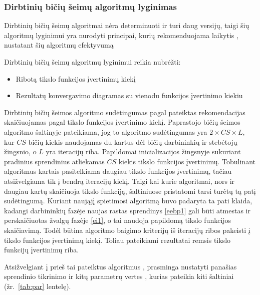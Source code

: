 \documentclass{VUMIFPSmagistrinis}
\begin{document}
\subsubsection{Dirbtinių bičių šeimų algoritmų lyginimas}


Dirbtinių bičių šeimų algoritmai nėra determinuoti ir turi daug versijų, taigi šių algoritmų lyginimui yra nurodyti principai, kurių rekomenduojama laikytis \cite{MLK15}, nustatant šių algoritmų efektyvumą

Dirbtinių bičių šeimų algoritmų lyginimui reikia nubrėžti:
\begin{itemize}
    \item Ribotą tikslo funkcijos įvertinimų kiekį
    \item Rezultatų konvergavimo diagramas su vienodu funkcijos įvertinimo kiekiu
\end{itemize}

Dirbtinių bičių šeimos algoritmo sudėtingumas pagal pateiktas rekomendacijas skaičiuojamas pagal tikslo funkcijos įvertinimo kiekį. Paprastojo bičių šeimos algoritmo šaltinyje pateikiama, jog to algoritmo sudėtingumas yra $2\times CS\times L$, kur $CS$ bičių kiekis naudojamas du kartus dėl bičių darbininkių ir stebėtojų žingsnio, o $L$ yra iteracijų riba. Papildomai inicializacijos žingsnyje sukuriant pradinius sprendinius atliekamas $CS$ kiekis tikslo funkcijos įvertinimų. Tobulinant algoritmus kartais pasitelkiama daugiau tikslo funkcijos įvertinimų, tačiau atsižvelgiama tik į bendrą iteracijų kiekį. Taigi kai kurie algoritmai, nors ir daugiau kartų skaičiuoja tikslo funkciją, šaltiniuose pristatomi tarsi turėtų tą patį sudėtingumą. Kuriant naująjį spietimosi algoritmą buvo padaryta ta pati klaida, kadangi darbininkių fazėje naujas rastas sprendinys \eqref{eebp1} gali būti atmestas ir perskaičiuotas žvalgų fazėje \eqref{ei1}, o tai naudoja papildomą tikslo funkcijos skaičiavimą. Todėl būtina algoritmo baigimo kriterijų iš iteracijų ribos pakeisti į tikslo funkcijos įvertinimų kiekį. Toliau pateikiami rezultatai remsis tikslo funkcijų įvertinimų riba.


Atsižvelgiant į prieš tai pateiktus algoritmus \cite{ABK19, KaG14}, prasminga nustatyti panašias sprendinio tikrinimo ir kitų parametrų vertes , kurias pateikia kiti šaltiniai (žr.~\ref{tab:par} lentelę). 
\end{document}
